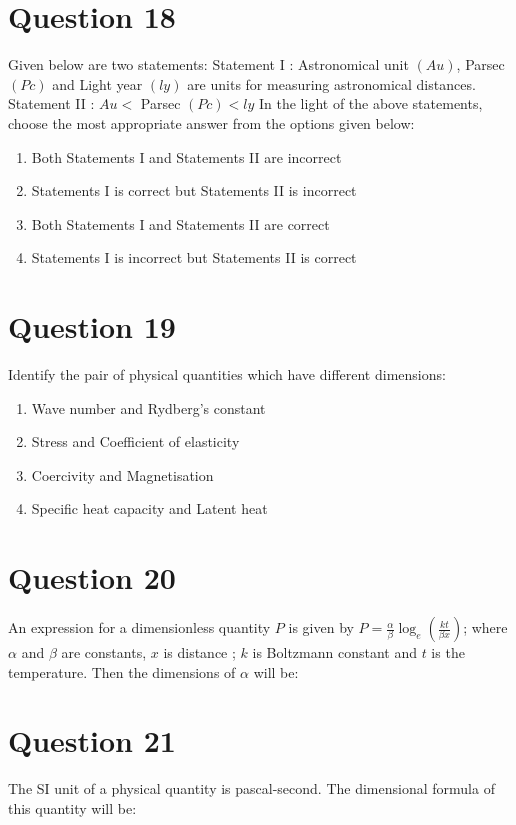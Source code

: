\documentclass{article}
\begin{document}
\section*{Question 18}
Given below are two statements:
Statement I : Astronomical unit \((Au)\), Parsec \((Pc)\) and Light year \((ly)\) are units for measuring astronomical distances.
Statement II : \(Au <\) Parsec \(( Pc )< ly\)
In the light of the above statements, choose the most appropriate answer from the options given below: 
\begin{enumerate}[label=(\alph*)]
\item Both Statements I and Statements II are incorrect
\item Statements I is correct but Statements II is incorrect
\item Both Statements I and Statements II are correct
\item Statements I is incorrect but Statements II is correct
\end{enumerate}
\newpage
\section*{Question 19}
Identify the pair of physical quantities which have different dimensions: 
\begin{enumerate}[label=(\alph*)]
\item Wave number and Rydberg's constant
\item Stress and Coefficient of elasticity
\item Coercivity and Magnetisation
\item Specific heat capacity and Latent heat
\end{enumerate}
\newpage
\section*{Question 20}
An expression for a dimensionless quantity \(P\) is given by \(P =\frac{\alpha}{\beta} \log _{ e }\left(\frac{ kt }{\beta x }\right)\); where \(\alpha\) and \(\beta\) are constants, \(x\) is distance ; \(k\) is Boltzmann constant and \(t\) is the temperature. Then the dimensions of \(\alpha\) will be:
\begin{enumerate}[label=(\alph*)]
\end{enumerate}
\newpage
\section*{Question 21}
The SI unit of a physical quantity is pascal-second. The dimensional formula of this quantity will be: 
\begin{enumerate}[label=(\alph*)]
\end{enumerate}
\newpage
\end{document}
